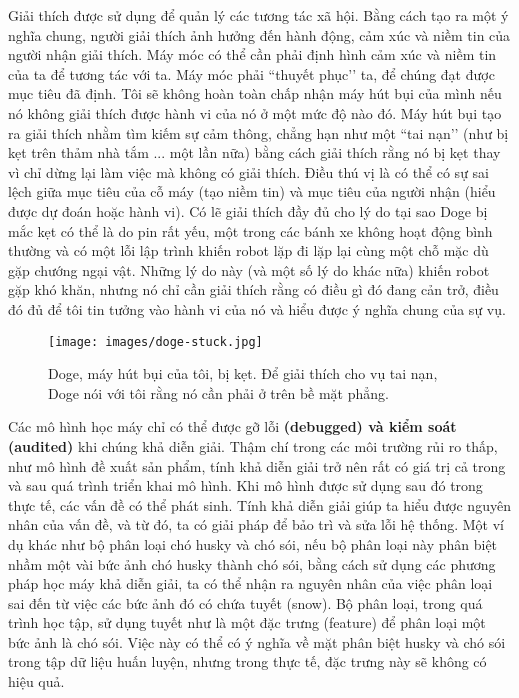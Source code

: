 Giải thích được sử dụng để quản lý các tương tác xã hội. Bằng cách tạo ra một ý nghĩa chung, người giải thích ảnh hưởng đến hành động, cảm xúc và niềm tin của người nhận giải thích. Máy móc có thể cần phải định hình cảm xúc và niềm tin của ta để tương tác với ta. Máy móc phải ``thuyết phục’’ ta, để chúng đạt được mục tiêu đã định. Tôi sẽ không hoàn toàn chấp nhận máy hút bụi của mình nếu nó không giải thích được hành vi của nó ở một mức độ nào đó. Máy hút bụi tạo ra giải thích nhằm tìm kiếm sự cảm thông, chẳng hạn như một ``tai nạn’’ (như bị kẹt trên thảm nhà tắm ... một lần nữa) bằng cách giải thích rằng nó bị kẹt thay vì chỉ dừng lại làm việc mà không có giải thích. Điều thú vị là có thể có sự sai lệch giữa mục tiêu của cỗ máy (tạo niềm tin) và mục tiêu của người nhận (hiểu được dự đoán hoặc hành vi). Có lẽ giải thích đầy đủ cho lý do tại sao Doge bị mắc kẹt có thể là do pin rất yếu, một trong các bánh xe không hoạt động bình thường và có một lỗi lập trình khiến robot lặp đi lặp lại cùng một chỗ mặc dù gặp chướng ngại vật. Những lý do này (và một số lý do khác nữa) khiến robot gặp khó khăn, nhưng nó chỉ cần giải thích rằng có điều gì đó đang cản trở, điều đó đủ để tôi tin tưởng vào hành vi của nó và hiểu được ý nghĩa chung của sự vụ.

\begin{figure*}[h!]
	\centering
	\texttt{[image: images/doge-stuck.jpg]}
	\caption{Doge, máy hút bụi của tôi, bị kẹt. Để giải thích cho vụ tai nạn, Doge nói với tôi rằng nó cần phải ở trên bề mặt phẳng.}
\end{figure*}

Các mô hình học máy chỉ có thể được gỡ lỗi \textbf{(debugged) và kiểm soát (audited)} khi chúng khả diễn giải. Thậm chí trong các môi trường rủi ro thấp, như mô hình đề xuất sản phẩm, tính khả diễn giải trở nên rất có giá trị cả trong và sau quá trình triển khai mô hình. Khi mô hình được sử dụng sau đó trong thực tế, các vấn đề có thể phát sinh. Tính khả diễn giải giúp ta hiểu được nguyên nhân của vấn đề, và từ đó, ta có giải pháp để bảo trì và sửa lỗi hệ thống. Một ví dụ khác như bộ phân loại chó husky và chó sói, nếu bộ phân loại này phân biệt nhầm một vài bức ảnh chó husky thành chó sói, bằng cách sử dụng các phương pháp học máy khả diễn giải, ta có thể nhận ra nguyên nhân của việc phân loại sai đến từ việc các bức ảnh đó có chứa tuyết (snow). Bộ phân loại, trong quá trình học tập, sử dụng tuyết như là một đặc trưng (feature) để phân loại một bức ảnh là chó sói. Việc này có thể có ý nghĩa về mặt phân biệt husky và chó sói trong tập dữ liệu huấn luyện, nhưng trong thực tế, đặc trưng này sẽ không có hiệu quả.

